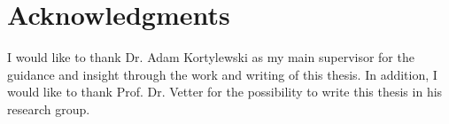 \chapter{Acknowledgments}
I would like to thank Dr. Adam Kortylewski as my main supervisor for the guidance and insight through the work and  writing of this thesis. In addition, I would like to thank Prof.  Dr.  Vetter for the possibility to write this thesis in his
research group.